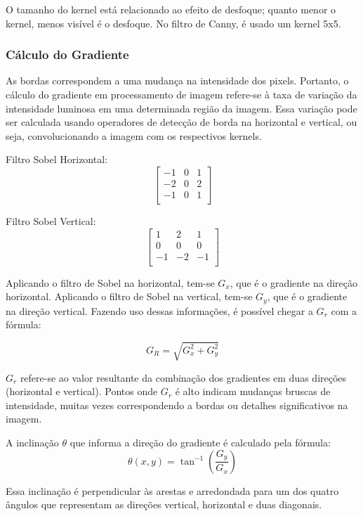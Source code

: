 O tamanho do kernel está relacionado ao efeito de desfoque; quanto menor o kernel, menos visível é o desfoque. No filtro de Canny, é usado um kernel 5x5.




\subsubsection[Cálculo do Gradiente]{Cálculo do Gradiente}

As bordas correspondem a uma mudança na intensidade dos pixels. Portanto, o cálculo do gradiente em processamento de imagem refere-se à taxa de variação da intensidade luminosa em uma determinada região da imagem. Essa variação pode ser calculada usando operadores de detecção de borda na horizontal e vertical, ou seja, convolucionando a imagem com os respectivos kernels.

Filtro Sobel Horizontal:
\[
    \begin{bmatrix}
        -1 & 0 & 1 \\
        -2 & 0 & 2 \\
        -1 & 0 & 1 \\
    \end{bmatrix}
\]

Filtro Sobel Vertical:
\[
    \begin{bmatrix}
        1 & 2 & 1 \\
        0 & 0 & 0 \\
        -1 & -2 & -1 \\
    \end{bmatrix}
\]


Aplicando o filtro de Sobel na horizontal, tem-se $G_x$, que é o gradiente na direção horizontal. Aplicando o filtro de Sobel na vertical, tem-se $G_y$, que é o gradiente na direção vertical. Fazendo uso dessas informações, é possível chegar a $G_r$ com a fórmula:

$$G_R = \sqrt{G_x^2 + G_y^2}$$

$G_r$ refere-se ao valor resultante da combinação dos gradientes em duas direções (horizontal e vertical). Pontos onde $G_r$ é alto indicam mudanças bruscas de intensidade, muitas vezes correspondendo a bordas ou detalhes significativos na imagem. 

A inclinação $\theta$ que informa a direção do gradiente é calculado pela fórmula:
$$\theta(x,y) = \tan^{-1}\left(\frac{G_y}{G_x}\right)$$

Essa inclinação é perpendicular às arestas e arredondada para um dos quatro ângulos que representam as direções vertical, horizontal e duas diagonais.



